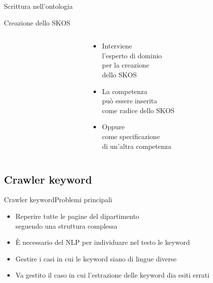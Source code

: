 \documentclass[dvips, 11pt]{beamer}
\begin{document}
\begin{frame}{Scrittura nell'ontologia}
  
\end{frame}

\begin{frame}{Creazione dello SKOS}
  \begin{columns}
    \begin{column}{5cm}
      
    \end{column}
    \begin{column}{5cm}
      \begin{itemize}
        \item Interviene\\
          l'\alert{esperto di dominio}\\
          per la creazione\\
          dello \alert{SKOS}
          \pause
        \item La competenza\\
          pu\`o essere inserita\\
          come \alert{radice} dello SKOS
          \pause
        \item Oppure\\
          come \alert{specificazione}\\
          di un'altra competenza
      \end{itemize}
    \end{column}
  \end{columns}
\end{frame}

\subsection{Crawler keyword}

\begin{frame}{Crawler keyword}{Problemi principali}
  \begin{itemize}
  \item Reperire tutte le pagine del dipartimento\\
    seguendo una \alert{struttura complessa}
    \pause
  \item \`E necessario del \alert{NLP} per individuare nel testo le \alert{keyword}
    \pause
  \item Gestire i casi in cui le keyword siano di \alert{lingue diverse}
    \pause
  \item Va gestito il caso in cui l'estrazione delle keyword dia \alert{esiti errati}
  \end{itemize}
\end{frame}
\end{document}
